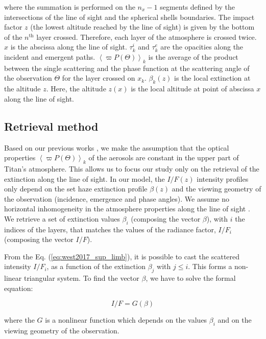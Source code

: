 where the summation is performed on the $n_x-1$ segments defined by the intersections of the line of sight and the
spherical shells boundaries. The impact factor $z$ (the lowest altitude reached by the line of sight) is given by the
bottom of the $n^\mathrm{th}$ layer crossed. Therefore, each layer of the atmosphere is crossed twice. $x$ is the
abscissa along the line of sight. $\tau^i_k$ and $\tau^e_k$ are the opacities along the incident and emergent paths.
$\left< \varpi P(\Theta)\right>_k$ is the average of the product between the single scattering and the phase function
at the scattering angle of the observation $\Theta$ for the layer crossed on $x_k$.  $\beta_k(z)$ is the local
extinction at the altitude $z$. Here, the altitude $z(x)$ is the local altitude at point of abscissa $x$ along the
line of sight.


\subsection{Retrieval method}

Based on our previous works \citep{Seignovert2017, West2018}, we make the assumption that the optical properties
$\left<\varpi P(\Theta)\right>_k$ of the aerosols are constant in the upper part of Titan's atmosphere. This allows
us to focus our study only on the retrieval of the extinction along the line of sight.
In our model, the $I/F (z)$ intensity profiles only depend on the set haze extinction profile $\beta(z)$ and the viewing
geometry of the observation (incidence, emergence and phase angles). We assume no horizontal inhomogeneity in the atmosphere
properties along the line of sight \citep{Seignovert2017}. We retrieve a set of extinction values $\beta_i$ (composing
the vector ${\beta}$), with $i$ the indices of the layers, that matches the values of the radiance factor, $I/F_i$
(composing the vector $I/F$).

From the Eq. (\ref{eq:west2017_sup_limb}), it is possible to cast the scattered intensity $I/F_i$, as a function of
the extinction $\beta_j$ with $j \le i$. This forms a non-linear triangular system. To find the vector $\beta$, we
have to solve the formal equation:

\begin{equation}
    I/F = G(\beta)
\end{equation}

where the ${G}$ is a nonlinear function which depends on the values $\beta_i$ and on the viewing geometry of the observation.

